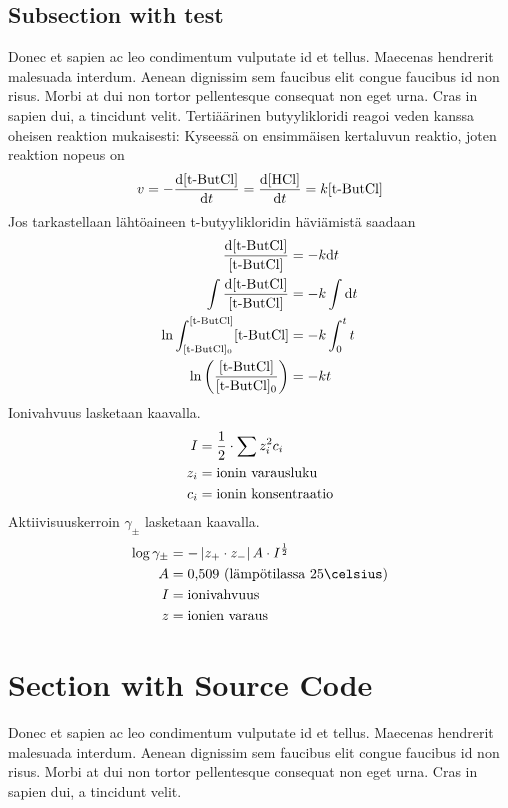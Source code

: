 \subsection{Subsection with \texorpdfstring{\Gls{test}}{Mathematics}}%
Donec et sapien ac leo condimentum vulputate id et tellus. Maecenas hendrerit malesuada interdum. Aenean dignissim sem faucibus elit congue faucibus id non risus. Morbi at dui non tortor pellentesque consequat non eget urna. Cras in sapien dui, a tincidunt velit. Tertiäärinen butyylikloridi reagoi veden kanssa oheisen reaktion mukaisesti:
Kyseessä on ensimmäisen kertaluvun reaktio, joten reaktion nopeus on
\begin{align}
v=-\frac{\mathrm{d}[\textnormal{t-ButCl}]}{\mathrm{d}t}=\frac{\mathrm{d}[\textnormal{HCl}]}{\mathrm{d}t}=k[\textnormal{t-ButCl}]
\end{align}
Jos tarkastellaan lähtöaineen t-butyylikloridin häviämistä saadaan
\begin{align}
\frac{\mathrm{d}[\textnormal{t-ButCl}]}{[\textnormal{t-ButCl}]}&=-k\mathrm{d}t \\
\int \frac{\mathrm{d}[\textnormal{t-ButCl}]}{[\textnormal{t-ButCl}]}&=-k \int \mathrm{d}t \\
\ln \int_{[\textnormal{t-ButCl}]_0}^{[\textnormal{t-ButCl}]} [\textnormal{t-ButCl}]&=-k\int_0^t t \\
\ln \left( \frac{[\textnormal{t-ButCl}]}{[\textnormal{t-ButCl}]_0} \right)&=-kt
\end{align}
Ionivahvuus lasketaan kaavalla.
\begin{align}
I&=\frac{1}{2}\cdot\sum z_i^2c_i \\
z_i&= \textnormal{ionin varausluku} \nonumber \\
c_i&= \textnormal{ionin konsentraatio} \nonumber
\end{align}
Aktiivisuuskerroin $\gamma_\pm$ lasketaan kaavalla.
\begin{align}
\log \gamma_\pm &= -\left|z_+\cdot z_-\right|A\cdot I^{\frac{1}{2}} \\
A &= \tn{0,509 (lämpötilassa 25\celsius}) \nonumber \\
I &= \tn{ionivahvuus} \nonumber \\
z &= \tn{ionien varaus} \nonumber
\end{align}

\section{Section with Source Code}
Donec et sapien ac leo condimentum vulputate id et tellus. Maecenas hendrerit malesuada interdum. Aenean dignissim sem faucibus elit congue faucibus id non risus. Morbi at dui non tortor pellentesque consequat non eget urna. Cras in sapien dui, a tincidunt velit.

